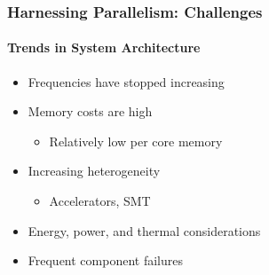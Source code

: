 \begin{frame}[t]
\frametitle{Harnessing Parallelism: Challenges}
\framesubtitle{Trends in System Architecture}
    \begin{itemize}
        \item Frequencies have stopped increasing
        \item Memory costs are high
          \begin{itemize}
          \item Relatively low per core memory
          \end{itemize}
        \item Increasing heterogeneity
          \begin{itemize}
          \item Accelerators, SMT
          \end{itemize}
        \item Energy, power, and thermal considerations
        \item Frequent component failures
     \end{itemize}
\end{frame}


